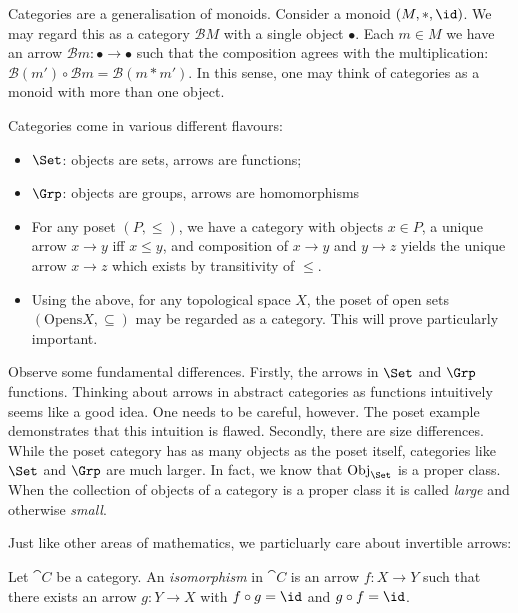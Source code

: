 \documentclass{article}
\begin{document}
Categories are a generalisation of monoids. Consider a monoid $(M,*,\id)$. We
may regard this as a category $\mathcal B M$ with a single object $\bullet$.
Each $m\in M$ we have an arrow $\mathcal B m:\bullet\to\bullet$ such that the
composition agrees with the multiplication: $\mathcal B(m')\circ\mathcal Bm =
\mathcal B(m * m')$. In this sense, one may think of categories as a monoid
with more than one object. 

\begin{example}
  Categories come in various different flavours:
  \begin{itemize}
    \item $\Set$: objects are sets, arrows are functions;
    \item $\Grp$: objects are groups, arrows are homomorphisms
    \item For any poset $(P,\leq)$, we have a category with objects $x\in P$,
      a unique arrow $x\to y$ iff $x\leq y$, and composition of $x\to y$ and
      $y\to z$ yields the unique arrow $x\to z$ which exists by transitivity
      of $\leq$.
    \item Using the above, for any topological space $X$, the poset of open sets
      $(\text{Opens}X, \subseteq)$ may be regarded as a category. This will prove
      particularly important.
  \end{itemize}
\end{example}

Observe some fundamental differences. Firstly, the arrows in $\Set$ and $\Grp$
functions. Thinking about arrows in abstract categories as functions
intuitively seems like a good idea. One needs to be careful, however. The poset
example demonstrates that this intuition is flawed. Secondly, there are size
differences. While the poset category has as many objects as the poset itself,
categories like $\Set$ and $\Grp$ are much larger. In fact, we know that
$\Obj_{\Set}$ is a proper class. When the collection of objects of a category
is a proper class it is called \emph{large} and otherwise \emph{small}.

Just like other areas of mathematics, we particluarly care about invertible
arrows:

\begin{definition}
  Let $\cat{C}$ be a category. An \emph{isomorphism} in $\cat{C}$ is an arrow
  $f:X\to Y$ such that there exists an arrow $g:Y\to X$ with $f\circ g = \id$
  and $g\circ f = \id$.
\end{definition}
\end{document}
